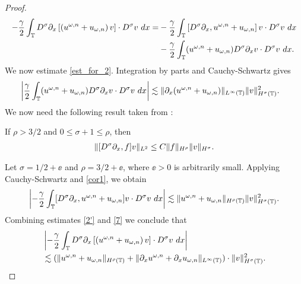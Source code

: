 \begin{proof}
\begin{equation}
\begin{split}
-\frac{\gamma}{2} \int_{\mathbb{T}} D^\sigma \partial_x \left[ \left( u^{\omega,n} + 
u_{\omega,n}
\right)v \right] \cdot D^\sigma v \ dx
= & -\frac{\gamma}{2}\int_{\mathbb{T}} \left[ D^\sigma \partial_x , u^{\omega,n} + 
u_{\omega,n}
\right]v \cdot D^\sigma v \ dx
\\
& - \frac{\gamma}{2} \int_{\mathbb{T}} (u^{\omega,n} + u_{\omega,n})
D^\sigma \partial_x v \cdot
D^\sigma v \ dx.
\label{est_for_2}
\end{split}
\end{equation}
%
%
We now estimate \eqref{est_for_2}. Integration 
by parts and Cauchy-Schwartz gives 
%
%
\begin{equation}
\begin{split}
\left | \frac{\gamma}{2} \int_{\mathbb{T}} (u^{\omega,n} + u_{\omega,n})
D^\sigma \partial_x v \cdot
D^\sigma v \ dx \right |
& \lesssim \|\partial_x(u^{\omega,n} + u_{\omega,n}) \|_{L^\infty(\mathbb{T})}
\|v\|_{H^\sigma(\mathbb{T})}^2.
\label{2'}
\end{split}
\end{equation}
%
%
We now need the following result
taken from \cite{Himonas_2009_Non-uniform-dep-per}:
%
\begin{lemma}
\label{cor1}
If $\rho > 3/2$ and $0 \le \sigma + 1 \le \rho$, then
%
%
\begin{equation}
\begin{split}
\|[D^\sigma \partial_x ,f]v\|_{L^2} \le C \|f\|_{H^\rho} \|v\|_{H^\sigma}.
\label{15}
\end{split}
\end{equation}
%
%
\end{lemma}
%
Let $\sigma = 1/2 + \ee$ and $\rho = 3/2 + \ee$, where 
$\ee > 0$ is
arbitrarily small. Applying Cauchy-Schwartz and \cref{cor1}, we obtain 
%
%
%
%
%
\begin{equation}
\begin{split}
\left | -\frac{\gamma}{2} \int_{\mathbb{T}} [D^\sigma \partial_x , u^{\omega,n} + 
u_{\omega,n}]v
\cdot D^\sigma v \ dx \right | \lesssim \|u^{\omega,n} +
u_{\omega,n}\|_{H^{\rho}(\mathbb{T})} \|v\|_{H^\sigma(\mathbb{T})}^2.
\label{7}
\end{split}
\end{equation}
%
%
Combining estimates \eqref{2'} and \eqref{7} we conclude that
%
%
\begin{equation}
\begin{split}
& \left | -\frac{\gamma}{2} \int_{\mathbb{T}} D^\sigma \partial_x \left[ \left( 
u^{\omega,n} + u_{\omega,n}
\right)v \right]  \cdot D^\sigma v \ dx \right |
\\
& \lesssim (\|u^{\omega,n} + u_{\omega,n}\|_{H^{\rho}(\mathbb{T})} + \|\partial_x 
u^{\omega,n} +
\partial_x u_{\omega,n}\|_{L^\infty(\mathbb{T})} ) \cdot \|v\|_{H^\sigma(\mathbb{T})}^2.
\label{8}
\end{split}
\end{equation}
%
%
%


\end{proof}

